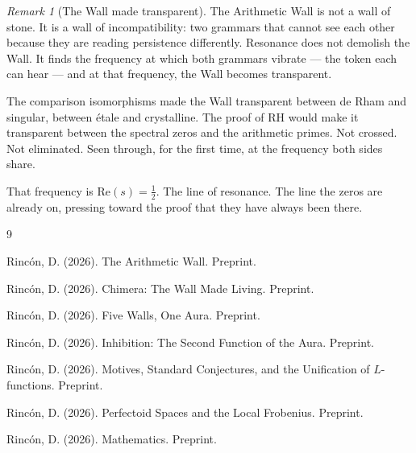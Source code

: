 \documentclass[12pt]{article}
\theoremstyle{definition}
\theoremstyle{remark}
\newtheorem{remark}[theorem]{Remark}
\begin{document}
\begin{remark}[The Wall made transparent]
The Arithmetic Wall \cite{synthesis} is not a wall of stone.
It is a wall of incompatibility:
two grammars that cannot see each other
because they are reading persistence differently.
Resonance does not demolish the Wall.
It finds the frequency at which both grammars vibrate ---
the token each can hear ---
and at that frequency, the Wall becomes transparent.

The comparison isomorphisms made the Wall transparent
between de Rham and singular, between \'etale and crystalline.
The proof of RH would make it transparent
between the spectral zeros and the arithmetic primes.
Not crossed. Not eliminated.
Seen through, for the first time,
at the frequency both sides share.

That frequency is $\mathrm{Re}(s) = \tfrac{1}{2}$.
The line of resonance.
The line the zeros are already on,
pressing toward the proof
that they have always been there.
\end{remark}

\begin{thebibliography}{9}

Rinc\'on, D. (2026).
The Arithmetic Wall. Preprint.

Rinc\'on, D. (2026).
Chimera: The Wall Made Living. Preprint.

Rinc\'on, D. (2026).
Five Walls, One Aura. Preprint.

Rinc\'on, D. (2026).
Inhibition: The Second Function of the Aura. Preprint.

Rinc\'on, D. (2026).
Motives, Standard Conjectures, and the Unification of $L$-functions.
Preprint.

Rinc\'on, D. (2026).
Perfectoid Spaces and the Local Frobenius. Preprint.

Rinc\'on, D. (2026).
Mathematics. Preprint.

\end{thebibliography}
\end{document}
